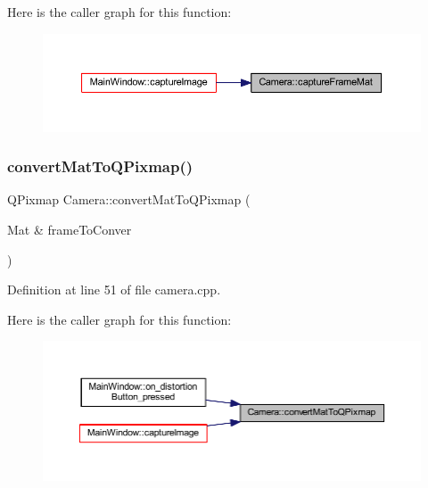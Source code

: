 Here is the caller graph for this function\+:
\nopagebreak
\begin{figure}[H]
\begin{center}
\leavevmode
\includegraphics[width=350pt]{class_camera_abfa965e4380023e2295edd9a13f4ee63_icgraph}
\end{center}
\end{figure}
\mbox{\label{class_camera_a4d72f8dcccdb1c6bc8a4c1f36ab1553a}} 
\subsubsection{\texorpdfstring{convertMatToQPixmap()}{convertMatToQPixmap()}}
{\footnotesize\ttfamily Q\+Pixmap Camera\+::convert\+Mat\+To\+Q\+Pixmap (\begin{DoxyParamCaption}\item[{Mat \&}]{frame\+To\+Conver }\end{DoxyParamCaption})}



Definition at line 51 of file camera.\+cpp.

Here is the caller graph for this function\+:
\nopagebreak
\begin{figure}[H]
\begin{center}
\leavevmode
\includegraphics[width=350pt]{class_camera_a4d72f8dcccdb1c6bc8a4c1f36ab1553a_icgraph}
\end{center}
\end{figure}
\mbox{\label{class_camera_a4702bbf7ccf85a5a2dd61fbf6abb7237}} 
